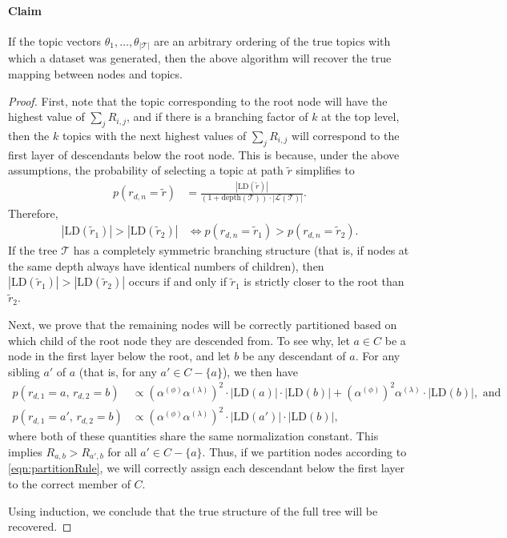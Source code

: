 \documentclass{article}
\begin{document}
\paragraph{Claim} If the topic vectors $\theta_1, \ldots, \theta_{|\mathcal T|}$ are an arbitrary ordering of the true topics with which a dataset was generated, then the above algorithm will recover the true mapping between nodes and topics.

\begin{proof}
First, note that the topic corresponding to the root node will have the highest value of $\sum_j R_{i,j}$,
and if there is a branching factor of $k$ at the top level, then the $k$ topics with the next highest values of $\sum_j R_{i,j}$ will correspond to the first layer of descendants below the root node.
This is because, under the above assumptions, the probability of selecting a topic at path $\tilde r$ simplifies to
\begin{align}
p(r_{d,n} = \tilde r)
&=
\frac{|\text{LD}(\tilde r)|}{(1 + \text{depth}(\mathcal T)) \cdot |\mathcal L(\mathcal T)|}.
\end{align}
Therefore,
\begin{align}
|\text{LD}(\tilde r_1)| > |\text{LD}(\tilde r_2)|
&\iff
p(r_{d,n} = \tilde r_1) > p(r_{d,n} = \tilde r_2).
\end{align}
If the tree $\mathcal T$ has a completely symmetric branching structure (that is, if nodes at the same depth always have identical numbers of children), then $|\text{LD}(\tilde r_1)| > |\text{LD}(\tilde r_2)|$ occurs if and only if $\tilde r_1$ is strictly closer to the root than $\tilde r_2$.

Next, we prove that the remaining nodes will be correctly partitioned based on which child of the root node they are descended from.
To see why, let $a \in C$ be a node in the first layer below the root, and let $b$ be any descendant of $a$.
For any sibling $a'$ of $a$ (that is, for any $a' \in C - \{a\}$), we then have
\begin{align}
p(r_{d,1} = a, \, r_{d,2} = b)
&\propto
  \left( \alpha^{(\phi)} \alpha^{(\lambda)} \right)^2 \cdot |\text{LD}(a)| \cdot |\text{LD}(b)|
  + \left( \alpha^{(\phi)} \right)^2 \alpha^{(\lambda)} \cdot |\text{LD}(b)|
,\text{ and} \\
p(r_{d,1} = a', \, r_{d,2} = b)
&\propto
  \left( \alpha^{(\phi)} \alpha^{(\lambda)} \right)^2 \cdot |\text{LD}(a')| \cdot |\text{LD}(b)|,
\end{align}
where both of these quantities share the same normalization constant.
This implies $R_{a,b} > R_{a',b}$ for all $a' \in C - \{a\}$.
Thus, if we partition nodes according to \eqref{eqn:partitionRule}, we will correctly assign each descendant below the first layer to the correct member of $C$.

Using induction, we conclude that the true structure of the full tree will be recovered.
\end{proof}
\end{document}
